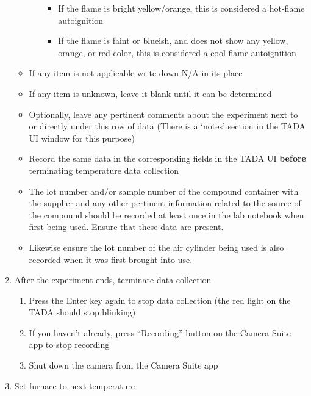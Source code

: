 \begin{enumerate}
\begin{itemize}
\begin{enumerate}
      \begin{itemize}
      \tightlist
      \item
        If the flame is bright yellow/orange, this is considered a
        hot-flame autoignition
      \item
        If the flame is faint or blueish, and does not show any yellow,
        orange, or red color, this is considered a cool-flame
        autoignition
      \end{itemize}
    \end{enumerate}
  \item
    If any item is not applicable write down N/A in its place
  \item
    If any item is unknown, leave it blank until it can be determined
  \item
    Optionally, leave any pertinent comments about the experiment next
    to or directly under this row of data (There is a `notes' section in
    the TADA UI window for this purpose)
  \item
    Record the same data in the corresponding fields in the TADA UI
    \textbf{before} terminating temperature data collection
  \item
    The lot number and/or sample number of the compound container with
    the supplier and any other pertinent information related to the
    source of the compound should be recorded at least once in the lab
    notebook when first being used. Ensure that these data are present.
  \item
    Likewise ensure the lot number of the air cylinder being used is
    also recorded when it was first brought into use.
  \end{itemize}
\item
  After the experiment ends, terminate data collection

  \begin{enumerate}
  \def\labelenumii{\arabic{enumii}.}
  \tightlist
  \item
    Press the Enter key again to stop data collection (the red light on
    the TADA should stop blinking)
  \item
    If you haven't already, press ``Recording'' button on the Camera
    Suite app to stop recording
  \item
    Shut down the camera from the Camera Suite app
  \end{enumerate}
\item
  Set furnace to next temperature


\end{enumerate}
